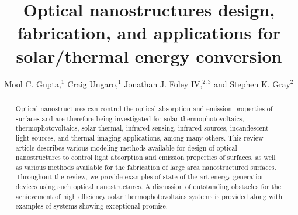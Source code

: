 \documentclass[10pt,letterpaper]{article}
\begin{document}
\title{Optical nanostructures design, fabrication, and applications for solar/thermal energy conversion } %

\author{Mool C. Gupta,$^1$ Craig Ungaro,$^1$ 
Jonathan J. Foley IV,$^{2,3}$ and Stephen K. Gray$^2$}

\address{$^1$Department of Electrical \& Computer Engineering, University of Virginia, Charlottesville, Virginia, 22901, USA \\
$^2$Center for Nanoscale Materials, Argonne National Laboratory, 9700 South Cass Avenue, Argonne, IL, 60439, USA \\
$^3$Department of Chemistry, William Paterson University, 300 Pompton Road, Wayne, NJ, 07470, USA \\
$^1$mgupta@virginia.edu \\
$^2$gray@anl.gov}


\begin{abstract}
Optical nanostructures can control the optical absorption and emission properties of surfaces and are therefore being investigated for solar thermophotovoltaics, thermophotovoltaics, solar thermal, infrared sensing, infrared sources, incandescent light sources, and thermal imaging applications, among many others. This review article describes various modeling methods available for design of 
optical nanostructures to control light absorption and emission properties of surfaces, as well as various methods available for the fabrication of large area nanostructured surfaces. Throughout the review, we provide examples of state of the art energy generation devices using such 
optical nanostructures.  A discussion of outstanding obstacles for the achievement of high efficiency solar thermophotovoltaics systems is provided along with examples of systems showing exceptional promise. 
\end{abstract}



\end{document}
